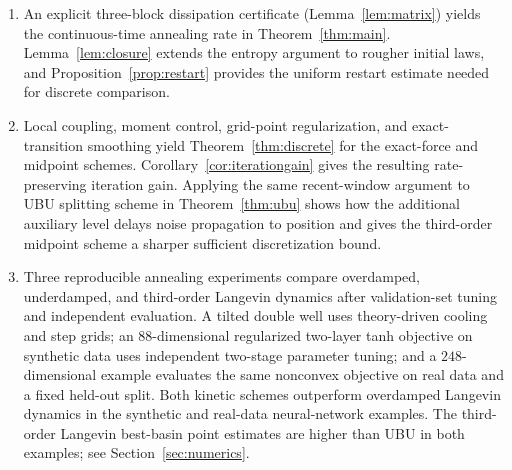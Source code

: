 \documentclass[11pt]{article}
\theoremstyle{definition}
\begin{document}
\begin{enumerate}[label=(\roman*)]
\item An explicit three-block dissipation certificate
(Lemma~\ref{lem:matrix}) yields the continuous-time annealing rate in
Theorem~\ref{thm:main}.  Lemma~\ref{lem:closure} extends the entropy argument to
rougher initial laws, and Proposition~\ref{prop:restart} provides the uniform
restart estimate needed for discrete comparison.

\item Local coupling, moment control, grid-point regularization, and
exact-transition smoothing yield Theorem~\ref{thm:discrete} for the exact-force
and midpoint schemes.  Corollary~\ref{cor:iterationgain} gives the resulting
rate-preserving iteration gain.  Applying the same recent-window argument to
UBU splitting scheme in Theorem~\ref{thm:ubu} shows how the additional auxiliary level delays
noise propagation to position and gives the third-order midpoint scheme a
sharper sufficient discretization bound.

\item Three reproducible annealing experiments compare overdamped, underdamped,
and third-order Langevin dynamics after validation-set tuning and independent
evaluation.  A tilted double well uses theory-driven cooling and step grids; an
$88$-dimensional regularized two-layer tanh objective on synthetic data uses independent two-stage
parameter tuning; and a $248$-dimensional example evaluates the same
nonconvex objective on real data and a fixed held-out split.  Both kinetic
schemes outperform overdamped Langevin dynamics in the synthetic and real-data
neural-network examples.  The third-order Langevin best-basin point estimates are higher
than UBU in both examples; see Section~\ref{sec:numerics}.
\end{enumerate}
\end{document}
